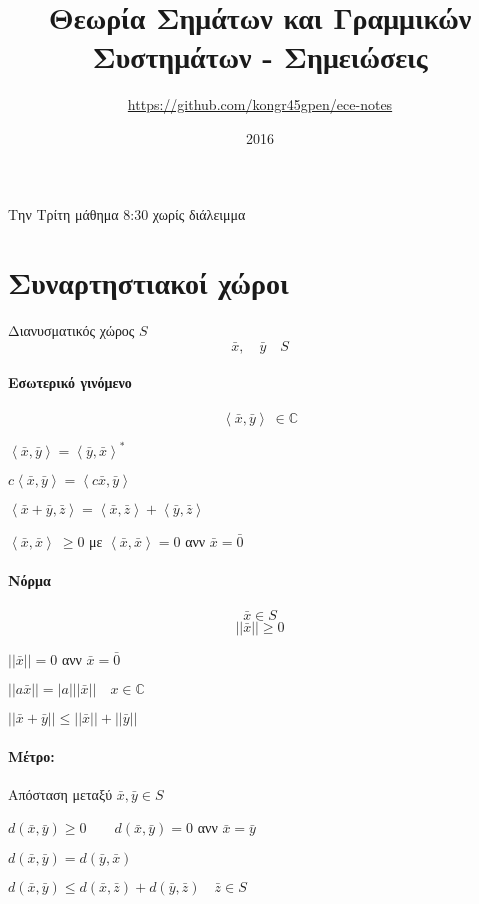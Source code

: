 \documentclass[11pt,a4paper,titlepage,fleqn]{article}
\title{Θεωρία Σημάτων και Γραμμικών Συστημάτων - Σημειώσεις}
\date{2016}
\author{\textlatin{\csuse{no\greek @numbers}\selectlanguage{english} \url{https://github.com/kongr45gpen/ece-notes}}}
\begin{document}
	Την Τρίτη μάθημα 8:30 χωρίς διάλειμμα

	

	\section{Συναρτηστιακοί χώροι}
	Διανυσματικός χώρος \( S \)
	\[
	\bar x,\quad \bar y\quad S
	\]

	\paragraph{Εσωτερικό γινόμενο}
	\[ \left\langle\bar x,\bar y\right\rangle\ \in \mathbb C  \]
	\begin{enumpar}
		\item \( \left\langle\bar x,\bar y\right\rangle
		= \left\langle\bar y,\bar x\right\rangle^* \)
		\item \( c\left\langle\bar x,\bar y\right\rangle
		=\left\langle c\bar x,\bar y\right\rangle \)
		\item \( \left\langle\bar x+\bar y,\bar z\right\rangle
		= \left\langle\bar x,\bar z\right\rangle+\left\langle\bar y,\bar z\right\rangle \)
		\item \( \left\langle\bar x,\bar x\right\rangle \ \geq 0 \) με
		\( \left\langle\bar x,\bar x\right\rangle = 0 \) ανν \( \bar x = \bar 0 \)
	\end{enumpar}

	\paragraph{Νόρμα}
	\[
	\bar x \in S
	\]\[
	||\bar x|| \geq0
	\]
	\begin{enumpar}
		\item \( ||\bar x|| = 0 \) ανν \( \bar x = \bar 0 \)
		\item \( ||a\bar x|| = |a|||\bar x|| \quad x \in\mathbb C \)
		\item \( ||\bar x+\bar y|| \leq ||\bar x|| + ||\bar y|| \)
	\end{enumpar}
	\paragraph{Μέτρο:} Απόσταση μεταξύ \( \bar x,\bar y \in S \)
	\begin{enumpar}
		\item \( d(\bar x,\bar y)\geq 0 \qquad d(\bar x,\bar y)=0 \)
		ανν \( \bar x = \bar y \)
		\item \( d(\bar x,\bar y) = d(\bar y,\bar x) \)
		\item \( d(\bar x,\bar y) \leq d(\bar x,\bar z) + d(\bar y,\bar z)
		\quad \bar z\in S
		 \)

    \end{enumpar}
    
\end{document}
